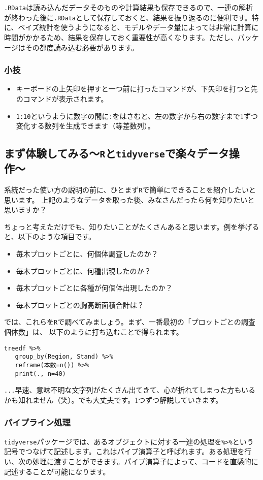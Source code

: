 \verb|.RData|は読み込んだデータそのものや計算結果も保存できるので、一連の解析が終わった後に\verb|.RData|として保存しておくと、結果を振り返るのに便利です。特に、ベイズ統計を使うようになると、モデルやデータ量によっては非常に計算に時間がかかるため、結果を保存しておく重要性が高くなります。ただし、パッケージはその都度読み込む必要があります。

    \subsubsection{小技}
\begin{itemize}
	\item キーボードの上矢印を押すと一つ前に打ったコマンドが、下矢印を打つと先のコマンドが表示されます。
	\item \verb|1:10|というように数字の間に\verb|:|をはさむと、左の数字から右の数字まで1ずつ変化する数列を生成できます（等差数列）。
\end{itemize}

  \subsection{まず体験してみる〜\texttt{R}と\texttt{tidyverse}で楽々データ操作〜}
系統だった使い方の説明の前に、ひとまず\texttt{R}で簡単にできることを紹介したいと思います。
上記のようなデータを取った後、みなさんだったら何を知りたいと思いますか？

ちょっと考えただけでも、知りたいことがたくさんあると思います。例を挙げると、以下のような項目です。
\begin{itemize}
  \item 毎木プロットごとに、何個体調査したのか？
  \item 毎木プロットごとに、何種出現したのか？
  \item 毎木プロットごとに各種が何個体出現したのか？
  \item 毎木プロットごとの胸高断面積合計は？
\end{itemize}

では、これらを\texttt{R}で調べてみましょう。まず、一番最初の「プロットごとの調査個体数」は、
以下のように打ち込むことで得られます。
\begin{verbatim}
treedf %>%
   group_by(Region, Stand) %>%
   reframe(本数=n()) %>%
   print(., n=40)
\end{verbatim}
\verb|...|早速、意味不明な文字列がたくさん出てきて、心が折れてしまった方もいるかも知れません（笑）。でも大丈夫です。1つずつ解説していきます。
    \subsubsection{パイプライン処理}
\verb|tidyverse|パッケージでは、あるオブジェクトに対する一連の処理を\verb|%>%|という記号でつなげて記述します。これはパイプ演算子と呼ばれます。ある処理を行い、次の処理に渡すことができます。パイプ演算子によって、コードを直感的に記述することが可能になります。

